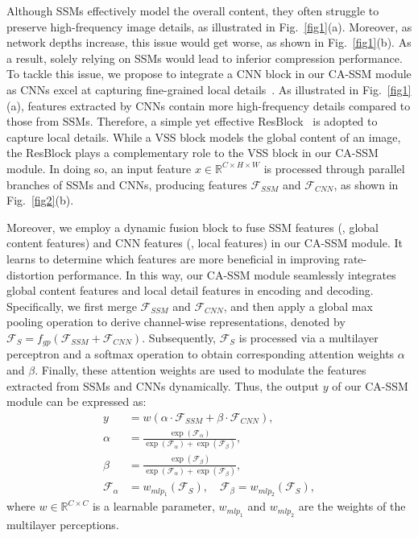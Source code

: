 Although SSMs effectively model the overall content, they often struggle to preserve high-frequency image details, as illustrated in Fig.~\ref{fig1}(a). 
Moreover, as network depths increase, this issue would get worse, as shown in Fig.~\ref{fig1}(b).
As a result, solely relying on SSMs would lead to inferior compression performance.
To tackle this issue, we propose to integrate a CNN block in our CA-SSM module as CNNs excel at capturing fine-grained local details~\cite{park2021vision, zou2022devil, liu2023learned}.
As illustrated in Fig.~\ref{fig1}(a), features extracted by CNNs contain more high-frequency details compared to those from SSMs.
Therefore, a simple yet effective ResBlock~\cite{he2016deep} is adopted to capture local details.
While a VSS block models the global content of an image, the ResBlock plays a complementary role to the VSS block in our CA-SSM module. 
In doing so, an input feature $x\in \mathbb{R}^{C \times H \times W}$ is processed through parallel branches of SSMs and CNNs, producing features $\mathcal{F}_\textit{SSM}$ and $\mathcal{F}_\textit{CNN}$, as shown in Fig.~\ref{fig2}(b). 


Moreover, we employ a dynamic fusion block to fuse SSM features (\ie, global content features) and CNN features (\ie, local features) in our CA-SSM module. 
It learns to determine which features are more beneficial in improving rate-distortion performance.
In this way, our CA-SSM module seamlessly integrates global content features and local detail features in encoding and decoding.
Specifically, we first merge $\mathcal{F}_\textit{SSM}$ and $\mathcal{F}_\textit{CNN}$, and then apply a global max pooling operation to derive channel-wise representations, denoted by $\mathcal{F}_\textit{S} = f_{gp}(\mathcal{F}_\textit{SSM} + \mathcal{F}_\textit{CNN})$. 
Subsequently, $\mathcal{F}_\textit{S}$ is processed via a multilayer perceptron and a softmax operation to obtain corresponding attention weights $\alpha$ and $\beta$. 
Finally, these attention weights are used to modulate the features extracted from SSMs and CNNs dynamically.
Thus, the output $y$ of our CA-SSM module can be expressed as:
\vspace{-0.5em}
\begin{equation}
\begin{aligned}
y &= w(\alpha \cdot \mathcal{F}_\textit{SSM} + \beta \cdot \mathcal{F}_\textit{CNN}), \\
\alpha &= \frac{\exp(\mathcal{F}_\alpha)}{\exp(\mathcal{F}_\alpha) + \exp(\mathcal{F}_\beta)}, \\
\beta &= \frac{\exp(\mathcal{F}_\beta)}{\exp(\mathcal{F}_\alpha) + \exp(\mathcal{F}_\beta)}, \\
\mathcal{F}_\alpha  & = w_{mlp_1}(\mathcal{F}_\textit{S}), \quad \mathcal{F}_\beta = w_{mlp_2}(\mathcal{F}_\textit{S}), 
\end{aligned}
\label{eq8}
\end{equation}
where $w \in \mathbb{R} ^{C\times C}$ is a learnable parameter, $w_{mlp_1}$ and $w_{mlp_2}$ are the weights of the multilayer perceptions.



